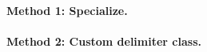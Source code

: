 \documentclass[a4paper,11pt]{article}
\begin{document}
\paragraph{Method 1: Specialize.}

\paragraph{Method 2: Custom delimiter class.}



\end{document}
